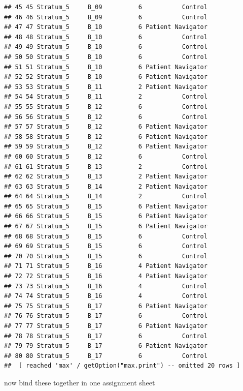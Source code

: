 \documentclass[
]{book}
\newenvironment{Shaded}{\begin{snugshade}}{\end{snugshade}}
\newcommand{\DataTypeTok}[1]{\textcolor[rgb]{0.13,0.29,0.53}{#1}}
\newcommand{\KeywordTok}[1]{\textcolor[rgb]{0.13,0.29,0.53}{\textbf{#1}}}
\newcommand{\NormalTok}[1]{#1}
\newcommand{\OperatorTok}[1]{\textcolor[rgb]{0.81,0.36,0.00}{\textbf{#1}}}
\newcommand{\StringTok}[1]{\textcolor[rgb]{0.31,0.60,0.02}{#1}}
\begin{document}
\begin{verbatim}
## 45 45 Stratum_5     B_09          6           Control
## 46 46 Stratum_5     B_09          6           Control
## 47 47 Stratum_5     B_10          6 Patient Navigator
## 48 48 Stratum_5     B_10          6           Control
## 49 49 Stratum_5     B_10          6           Control
## 50 50 Stratum_5     B_10          6           Control
## 51 51 Stratum_5     B_10          6 Patient Navigator
## 52 52 Stratum_5     B_10          6 Patient Navigator
## 53 53 Stratum_5     B_11          2 Patient Navigator
## 54 54 Stratum_5     B_11          2           Control
## 55 55 Stratum_5     B_12          6           Control
## 56 56 Stratum_5     B_12          6           Control
## 57 57 Stratum_5     B_12          6 Patient Navigator
## 58 58 Stratum_5     B_12          6 Patient Navigator
## 59 59 Stratum_5     B_12          6 Patient Navigator
## 60 60 Stratum_5     B_12          6           Control
## 61 61 Stratum_5     B_13          2           Control
## 62 62 Stratum_5     B_13          2 Patient Navigator
## 63 63 Stratum_5     B_14          2 Patient Navigator
## 64 64 Stratum_5     B_14          2           Control
## 65 65 Stratum_5     B_15          6 Patient Navigator
## 66 66 Stratum_5     B_15          6 Patient Navigator
## 67 67 Stratum_5     B_15          6 Patient Navigator
## 68 68 Stratum_5     B_15          6           Control
## 69 69 Stratum_5     B_15          6           Control
## 70 70 Stratum_5     B_15          6           Control
## 71 71 Stratum_5     B_16          4 Patient Navigator
## 72 72 Stratum_5     B_16          4 Patient Navigator
## 73 73 Stratum_5     B_16          4           Control
## 74 74 Stratum_5     B_16          4           Control
## 75 75 Stratum_5     B_17          6 Patient Navigator
## 76 76 Stratum_5     B_17          6           Control
## 77 77 Stratum_5     B_17          6 Patient Navigator
## 78 78 Stratum_5     B_17          6           Control
## 79 79 Stratum_5     B_17          6 Patient Navigator
## 80 80 Stratum_5     B_17          6           Control
##  [ reached 'max' / getOption("max.print") -- omitted 20 rows ]
\end{verbatim}

now bind these together in one assignment sheet

\begin{Shaded}
\end{Shaded}
\end{document}
